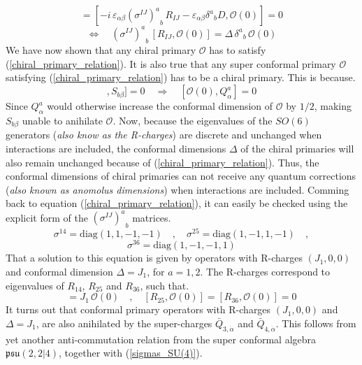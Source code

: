 %
%
\begin{equation*}
[\{ Q^a_\alpha, S_{b\beta} \}, \mathcal{O}(0)]
=
[
-i \, \varepsilon_{\alpha \beta} {(\sigma^{IJ})^a}_b \, R_{IJ}
- \varepsilon_{\alpha \beta} {\delta^a}_b D
,
\mathcal{O}(0)
]
=
0
\end{equation*}
%
%
\begin{equation}\label{chiral_primary_relation}
\Leftrightarrow \quad
%
{(\sigma^{IJ})^a}_b \, [R_{IJ}, \mathcal{O}(0)]
=
\Delta \, {\delta^a}_b \, \mathcal{O}(0)
\end{equation}
%
%
We have now shown that any chiral primary $\mathcal{O}$ has to satisfy (\ref{chiral_primary_relation}). It is also true that any super conformal primary $\mathcal{O}$ satisfying (\ref{chiral_primary_relation}) has to be a chiral primary. This is because.
%
%
\begin{equation}
[[ \mathcal{O}(0) , Q^a_\alpha ], S_{b\beta}] = 0
%
\quad \Rightarrow \quad
%
[ \mathcal{O}(0) , Q^a_\alpha ] = 0
\end{equation}
%
%
Since $Q^a_\alpha$ would otherwise increase the conformal dimension of $\mathcal{O}$ by $1/2$, making $S_{b\beta}$ unable to anihilate $\mathcal{O}$. Now, because the eigenvalues of the $SO(6)$ generators (\textit{also know as the R-charges}) are discrete and unchanged when interactions are included, the conformal dimensions $\Delta$ of the chiral primaries will also remain unchanged because of (\ref{chiral_primary_relation}). Thus, the conformal dimensions of chiral primaries can not receive any quantum corrections (\textit{also known as anomolus dimensions}) when interactions are included. Comming back to equation (\ref{chiral_primary_relation}), it can easily be checked using the explicit form of the ${(\sigma^{IJ})^a}_b$ matrices.
%
%
\begin{equation*}
\sigma^{14} = \text{diag}(1,1,-1,-1)
%
\quad , \quad
%
\sigma^{25} = \text{diag}(1,-1,1,-1)
%
\quad ,
\end{equation*}
%
%
\begin{equation}\label{sigmas_SU(4)}
\sigma^{36} = \text{diag}(1,-1,-1,1)
\end{equation}
%
%
That a solution to this equation is given by operators with R-charges $(J_1,0,0)$ and conformal dimension $\Delta = J_1$, for $a=1,2$. The R-charges correspond to eigenvalues of $R_{14}$, $R_{25}$ and $R_{36}$, such that.
%
%
\begin{equation}
[R_{14}, \mathcal{O}(0)] = J_1 \, \mathcal{O}(0)
%
\quad , \quad
%
[R_{25}, \mathcal{O}(0)] = [R_{36}, \mathcal{O}(0)] = 0
\end{equation}
%
%
It turns out that conformal primary operators with R-charges $(J_1,0,0)$ and $\Delta = J_1$, are also anihilated by the super-charges $\bar{Q}_{3,\dot{\alpha}}$ and $\bar{Q}_{4,\dot{\alpha}}$. This follows from yet another anti-commutation relation from the super conformal algebra $\mathfrak{psu}(2,2|4)$, together with (\ref{sigmas_SU(4)}).

